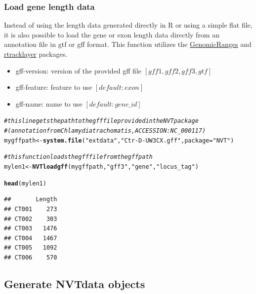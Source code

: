 \documentclass[11pt]{article}\usepackage[]{graphicx}\usepackage[usenames,dvipsnames]{color}
\makeatletter
\newcommand{\hlstr}[1]{\textcolor[rgb]{0.192,0.494,0.8}{#1}}%
\newcommand{\hlcom}[1]{\textcolor[rgb]{0.678,0.584,0.686}{\textit{#1}}}%
\newcommand{\hlstd}[1]{\textcolor[rgb]{0.345,0.345,0.345}{#1}}%
\newcommand{\hlkwb}[1]{\textcolor[rgb]{0.69,0.353,0.396}{#1}}%
\newcommand{\hlkwc}[1]{\textcolor[rgb]{0.333,0.667,0.333}{#1}}%
\newcommand{\hlkwd}[1]{\textcolor[rgb]{0.737,0.353,0.396}{\textbf{#1}}}%
\newenvironment{kframe}{%
 \def\at@end@of@kframe{}%
 \ifinner\ifhmode%
  \def\at@end@of@kframe{\end{minipage}}%
  \begin{minipage}{\columnwidth}%
 \fi\fi%
 \def\FrameCommand##1{\hskip\@totalleftmargin \hskip-\fboxsep
 \colorbox{shadecolor}{##1}\hskip-\fboxsep
     \hskip-\linewidth \hskip-\@totalleftmargin \hskip\columnwidth}%
 \MakeFramed {\advance\hsize-\width
   \@totalleftmargin\z@ \linewidth\hsize
   \@setminipage}}%
 {\par\unskip\endMakeFramed%
 \at@end@of@kframe}
\newenvironment{knitrout}{}{} %
\makeatother
\begin{document}
\subsubsection{Load gene length data}

Instead of using the length data generated directly in R or using a simple flat file, it is also possible to load the gene or exon length data directly from an annotation file in gtf or gff format. This function utilizes the \href{https://bioconductor.org/packages/release/bioc/html/GenomicRanges.html}{GenomicRanges}\cite{lawrence2013} and \href{https://www.bioconductor.org/packages/3.3/bioc/html/rtracklayer.html}{rtracklayer}\cite{lawrence2009} packages.

\begin{itemize}
 \item gff-version: version of the provided gff file $[ gff1,gff2,gff3,gtf ]$
 \item gff-feature: feature to use $[ default: exon ]$
 \item gff-name: name to use $[ default: gene\_id ]$
\end{itemize}

\begin{knitrout}
\color{fgcolor}\begin{kframe}
\begin{alltt}
\hlcom{#this line gets the path to the gff file provided in the NVT package}
\hlcom{#(annotation from Chlamydia trachomatis, ACCESSION: NC_000117 )}
\hlstd{mygffpath} \hlkwb{<-} \hlkwd{system.file}\hlstd{(}\hlstr{"extdata"}\hlstd{,} \hlstr{"Ctr-D-UW3CX.gff"}\hlstd{,} \hlkwc{package} \hlstd{=} \hlstr{"NVT"}\hlstd{)}

\hlcom{#this function loads the gff file from the gffpath}
\hlstd{mylen1} \hlkwb{<-} \hlkwd{NVTloadgff}\hlstd{(mygffpath,}\hlstr{"gff3"}\hlstd{,}\hlstr{"gene"}\hlstd{,}\hlstr{"locus_tag"}\hlstd{)}

\hlkwd{head}\hlstd{(mylen1)}
\end{alltt}
\begin{verbatim}
##       Length
## CT001    273
## CT002    303
## CT003   1476
## CT004   1467
## CT005   1092
## CT006    570
\end{verbatim}
\end{kframe}
\end{knitrout}

\subsection{Generate NVTdata objects}
\end{document}
